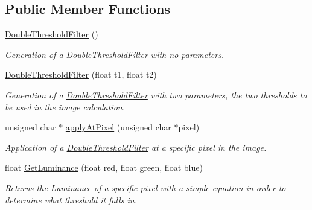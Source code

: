 \subsection*{Public Member Functions}
\begin{DoxyCompactItemize}
\item 
\mbox{\label{classDoubleThresholdFilter_ae4c841df681b376c611e2bc07a2a0d54}} 
\hyperlink{classDoubleThresholdFilter_ae4c841df681b376c611e2bc07a2a0d54}{Double\+Threshold\+Filter} ()
\begin{DoxyCompactList}\small\item\em Generation of a \hyperlink{classDoubleThresholdFilter}{Double\+Threshold\+Filter} with no parameters. \end{DoxyCompactList}\item 
\mbox{\label{classDoubleThresholdFilter_a8c65581e746bc42b627df785de7e4512}} 
\hyperlink{classDoubleThresholdFilter_a8c65581e746bc42b627df785de7e4512}{Double\+Threshold\+Filter} (float t1, float t2)
\begin{DoxyCompactList}\small\item\em Generation of a \hyperlink{classDoubleThresholdFilter}{Double\+Threshold\+Filter} with two parameters, the two thresholds to be used in the image calculation. \end{DoxyCompactList}\item 
\mbox{\label{classDoubleThresholdFilter_ab6e5b2d489d32913b8cb1854d4ba6db2}} 
unsigned char $\ast$ \hyperlink{classDoubleThresholdFilter_ab6e5b2d489d32913b8cb1854d4ba6db2}{apply\+At\+Pixel} (unsigned char $\ast$pixel)
\begin{DoxyCompactList}\small\item\em Application of a \hyperlink{classDoubleThresholdFilter}{Double\+Threshold\+Filter} at a specific pixel in the image. \end{DoxyCompactList}\item 
\mbox{\label{classDoubleThresholdFilter_a1881b9f96b709926b6e64a6e67eea44a}} 
float \hyperlink{classDoubleThresholdFilter_a1881b9f96b709926b6e64a6e67eea44a}{Get\+Luminance} (float red, float green, float blue)
\begin{DoxyCompactList}\small\item\em Returns the Luminance of a specific pixel with a simple equation in order to determine what threshold it falls in. \end{DoxyCompactList}\end{DoxyCompactItemize}
